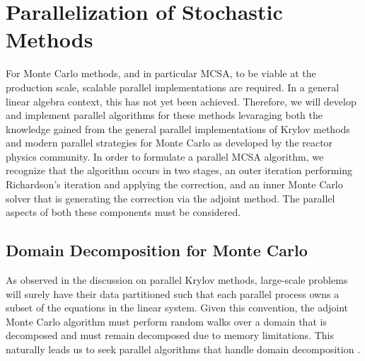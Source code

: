 \section{Parallelization of Stochastic Methods}
\label{sec:parallel_stochastic_methods}
For Monte Carlo methods, and in particular MCSA, to be viable at the
production scale, scalable parallel implementations are required. In a
general linear algebra context, this has not yet been
achieved. Therefore, we will develop and implement parallel algorithms
for these methods levaraging both the knowledge gained from the
general parallel implementations of Krylov methods and modern parallel
strategies for Monte Carlo as developed by the reactor physics
community. In order to formulate a parallel MCSA algorithm, we
recognize that the algorithm occurs in two stages, an outer iteration
performing Richardson's iteration and applying the correction, and an
inner Monte Carlo solver that is generating the correction via the
adjoint method. The parallel aspects of both these components must be
considered.

\subsection{Domain Decomposition for Monte Carlo}
\label{subsec:msod}
As observed in the discussion on parallel Krylov methods, large-scale
problems will surely have their data partitioned such that each
parallel process owns a subset of the equations in the linear
system. Given this convention, the adjoint Monte Carlo algorithm must
perform random walks over a domain that is decomposed and must remain
decomposed due to memory limitations. This naturally leads us to seek
parallel algorithms that handle domain decomposition
\citep{romano_towards_2010}.

